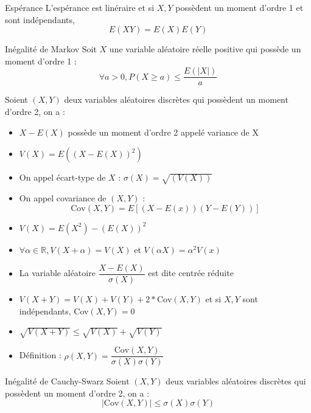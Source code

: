 \documentclass[french, a4paper, 10pt, twocolumn]{article}
\newcommand{\R}{\mathbb{R}}   %
\begin{document}
\begin{theoreme}{Espérance}
    L'espérance est linéraire et si \(X,Y\) possèdent un moment d'ordre 1 et sont indépendants,
    \[E(XY)=E(X)E(Y)\]
\end{theoreme}

\begin{theoreme}{Inégalité de Markov}
    Soit $X$ une variable aléatoire réelle positive qui possède un moment d'ordre 1 :
     \[\forall a>0, {P(X\geqslant a)\leqslant \frac{E(|X|)}{a}}\]
\end{theoreme}
 
\begin{definition}
    Soient \((X,Y)\) deux variables aléatoires discrètes qui possèdent un moment d'ordre 2, on a :
    \begin{itemize}[label=\(\bullet\)]
        \item \(X-E(X)\) possède un moment d'ordre 2 appelé variance de X
        \item \(V(X)=E((X-E(X))^2)\)
        \item On appel écart-type de \(X\) : \(\sigma(X)=\sqrt{(V(X))}\)
        \item On appel covariance de \((X,Y)\) : \[\mathrm{Cov}(X,Y)=E\left[(X-E(x))(Y-E(Y))\right]\]
    \end{itemize}

    \tcblower
    \begin{itemize}
        \item \(V(X)=E(X^2)-(E(X))^2\)
        \item \(\forall \alpha \in \R, V(X+\alpha)=V(X)\) et \(V(\alpha X)=\alpha^2V(x)\)
        \item La variable aléatoire \(\dfrac{X-E(X)}{\sigma(X)}\) est dite centrée réduite
        \item \(V(X+Y)=V(X)+V(Y)+2*\text{Cov}(X,Y)\) et si \(X,Y\) sont indépendants, Cov\((X,Y)=0\)
        \item \(\sqrt{V(X+Y)}\leq\sqrt{V(X)}+\sqrt{V(Y)}\)
        \item Définition : \(\rho(X,Y)=\dfrac{\text{Cov}(X,Y)}{\sigma(X)\sigma(Y)}\)
    \end{itemize}
\end{definition}

\begin{theoreme}{Inégalité de Cauchy-Swarz}
    Soient \((X,Y)\) deux variables aléatoires discrètes qui possèdent un moment d'ordre 2, on a :
        \[|\text{Cov}(X,Y)|\leq \sigma(X)\sigma(Y)\] 
\end{theoreme}
\end{document}
